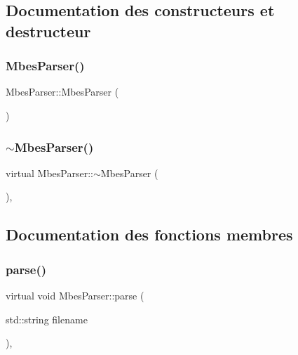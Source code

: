 \subsection{Documentation des constructeurs et destructeur}
\mbox{\label{classMbesParser_ac6ef7327a407484a528c0b1c0384db9f}} 
\subsubsection{\texorpdfstring{Mbes\+Parser()}{MbesParser()}}
{\footnotesize\ttfamily Mbes\+Parser\+::\+Mbes\+Parser (\begin{DoxyParamCaption}{ }\end{DoxyParamCaption})}

\mbox{\label{classMbesParser_aa72a4049542622ecebba6aec01a1e763}} 
\subsubsection{\texorpdfstring{$\sim$\+Mbes\+Parser()}{~MbesParser()}}
{\footnotesize\ttfamily virtual Mbes\+Parser\+::$\sim$\+Mbes\+Parser (\begin{DoxyParamCaption}{ }\end{DoxyParamCaption})\hspace{0.3cm}{\ttfamily [inline]}, {\ttfamily [virtual]}}



\subsection{Documentation des fonctions membres}
\mbox{\label{classMbesParser_a10e172520c1ca2b87dab51aef9e57c2a}} 
\subsubsection{\texorpdfstring{parse()}{parse()}}
{\footnotesize\ttfamily virtual void Mbes\+Parser\+::parse (\begin{DoxyParamCaption}\item[{std\+::string}]{filename }\end{DoxyParamCaption})\hspace{0.3cm}{\ttfamily [inline]}, {\ttfamily [virtual]}}



